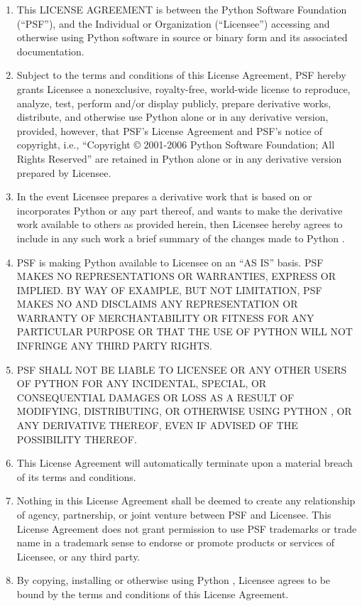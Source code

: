 \begin{enumerate}
\item
This LICENSE AGREEMENT is between the Python Software Foundation
(``PSF''), and the Individual or Organization (``Licensee'') accessing
and otherwise using Python \version{} software in source or binary
form and its associated documentation.

\item
Subject to the terms and conditions of this License Agreement, PSF
hereby grants Licensee a nonexclusive, royalty-free, world-wide
license to reproduce, analyze, test, perform and/or display publicly,
prepare derivative works, distribute, and otherwise use Python
\version{} alone or in any derivative version, provided, however, that
PSF's License Agreement and PSF's notice of copyright, i.e.,
``Copyright \copyright{} 2001-2006 Python Software Foundation; All
Rights Reserved'' are retained in Python \version{} alone or in any
derivative version prepared by Licensee.

\item
In the event Licensee prepares a derivative work that is based on
or incorporates Python \version{} or any part thereof, and wants to
make the derivative work available to others as provided herein, then
Licensee hereby agrees to include in any such work a brief summary of
the changes made to Python \version.

\item
PSF is making Python \version{} available to Licensee on an ``AS IS''
basis.  PSF MAKES NO REPRESENTATIONS OR WARRANTIES, EXPRESS OR
IMPLIED.  BY WAY OF EXAMPLE, BUT NOT LIMITATION, PSF MAKES NO AND
DISCLAIMS ANY REPRESENTATION OR WARRANTY OF MERCHANTABILITY OR FITNESS
FOR ANY PARTICULAR PURPOSE OR THAT THE USE OF PYTHON \version{} WILL
NOT INFRINGE ANY THIRD PARTY RIGHTS.

\item
PSF SHALL NOT BE LIABLE TO LICENSEE OR ANY OTHER USERS OF PYTHON
\version{} FOR ANY INCIDENTAL, SPECIAL, OR CONSEQUENTIAL DAMAGES OR
LOSS AS A RESULT OF MODIFYING, DISTRIBUTING, OR OTHERWISE USING PYTHON
\version, OR ANY DERIVATIVE THEREOF, EVEN IF ADVISED OF THE
POSSIBILITY THEREOF.

\item
This License Agreement will automatically terminate upon a material
breach of its terms and conditions.

\item
Nothing in this License Agreement shall be deemed to create any
relationship of agency, partnership, or joint venture between PSF and
Licensee.  This License Agreement does not grant permission to use PSF
trademarks or trade name in a trademark sense to endorse or promote
products or services of Licensee, or any third party.

\item
By copying, installing or otherwise using Python \version, Licensee
agrees to be bound by the terms and conditions of this License
Agreement.
\end{enumerate}


